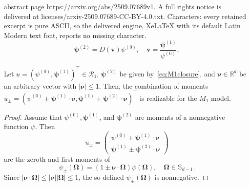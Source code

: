 \documentclass[10pt,a4paper]{amsart}
\newcommand{\OO}{\bm{\Omega}}
\newcommand{\R}{\mathbb{R}}
\newcommand{\Sp}{\mathbb{S}_{d-1}}
\newcommand{\po}{\boldsymbol{\psi}^{(1)}}
\newcommand{\pt}{\boldsymbol{\psi}^{(2)}}
\newcommand{\pz}{\psi^{(0)}}
\newcommand{\vel}{\mathbf{v}}
\begin{document}
abstract page https://arxiv.org/abs/2509.07689v1. A full rights notice is delivered at licenses/arxiv-2509.07689-CC-BY-4.0.txt. Characters: every retained excerpt is pure ASCII, so the delivered engine, XeLaTeX with its default Latin Modern text font, reports no missing character.
\begin{equation}\label{eq:M1closure}
    \pt = D\left(\vel\right)\pz, \quad \vel = \frac{\po}{\pz},
\end{equation}

\begin{lemma}\label{lem:upm}
    Let $u = (\pz,\po)^\top\in\mathcal{R}_1$, $\pt$ be given by~\eqref{eq:M1closure}, and $\bm\nu\in\R^d$ be an arbitrary vector with $|\bm\nu|\leq 1$. 
    Then, the combination of moments
    $u_\pm = (\pz\pm \po\cdot \bm\nu, \po\pm \pt\cdot\bm\nu)^\top$ is realizable
    for the $M_1$ model. 
\end{lemma}

\begin{proof}
    Assume that $\pz, \po$, and $\pt$ are moments of a nonnegative function $\psi$.
    Then 
    \begin{equation*}
        u_\pm = \left(\begin{array}{cc}
             \pz\pm \po\cdot \bm\nu \\
             \po\pm \pt\cdot\bm\nu
        \end{array}\right)
    \end{equation*}
    are the zeroth and first moments of 
    \begin{equation*}
        \psi_\pm(\OO) = (1\pm \bm\nu\cdot \OO)\psi(\OO),\quad \OO\in\Sp.
    \end{equation*}
    Since $|\bm\nu\cdot \OO|\leq |\bm\nu||\OO|\leq 1$, the so-defined
    $\psi_\pm(\OO)$ is nonnegative.
\end{proof}
\end{document}
